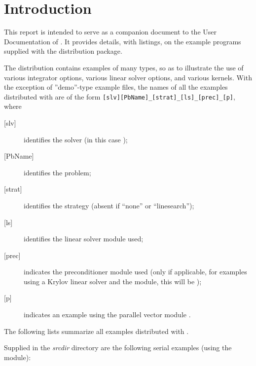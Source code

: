 \section{Introduction}\label{s:ex_intro}

This report is intended to serve as a companion document to the User
Documentation of {\kinsol} \cite{kinsol_ug}.  It provides details, with
listings, on the example programs supplied with the {\kinsol} distribution
package.

The {\kinsol} distribution contains examples of many types, so as to
illustrate the use of various integrator options, various linear solver
options, and various {\nvector} kernels.
With the exception of ''demo''-type example files, the names of all the examples 
distributed with {\sundials} are of the form
\verb![slv][PbName]_[strat]_[ls]_[prec]_[p]!, where
\begin{description}
\item [{[slv]}] identifies the solver (in this case );
\item [{[PbName]}] identifies the problem;
\item [{[strat]}] identifies the strategy (absent if ``none'' or ``linesearch'');
\item [{[ls]}] identifies the linear solver module used;
\item [{[prec]}] indicates the {\kinsol} preconditioner module used
  (only if applicable, for examples using a Krylov linear solver
  and the {\kinbbdpre} module, this will be );
\item [{[p]}] indicates an example using the parallel vector module {\nvecp}.
\end{description}

\vspace{0.2in}\noindent
The following lists summarize all examples distributed with {\kinsol}.

\vspace{0.2in}\noindent
Supplied in the {\em srcdir} directory are the
following serial examples (using the {\nvecs} module):

